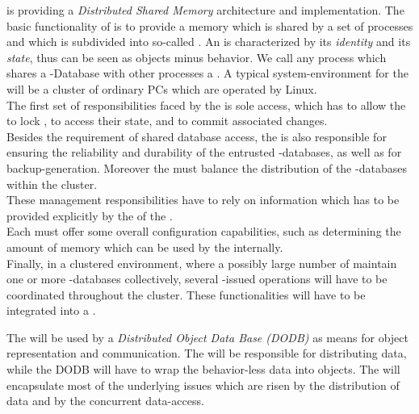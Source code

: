 \documentclass[a4paper, 12pt]{book}
\begin{document}
\SYNEIGHT is providing a \emph{Distributed Shared Memory}
architecture and implementation. The basic functionality of
\SYNEIGHT is to provide a memory which is shared by a set of
processes and which is subdivided into so-called . An
 is characterized by its \emph{identity} and its
\emph{state}, thus  can be seen as objects minus behavior.
We call any process which shares a \SYNEIGHT-Database with other
processes a . A typical system-environment for
the \SYNEIGHT will be a cluster of ordinary PCs which are operated
by Linux.\\

The first set of responsibilities faced by the \SYNEIGHT is sole
access, which has to allow the  to lock , to
access their state, and to commit associated changes.\\

Besides the requirement of shared database access, the \SYNEIGHT
is also responsible for ensuring the reliability and durability of the
entrusted \SYNEIGHT-databases, as well as for backup-generation.
Moreover the \SYNEIGHT must balance the distribution of the
\SYNEIGHT-databases within the cluster.\\

% 
These management responsibilities have to rely on information which has
to be provided explicitly by the  of the \SYNEIGHT.\\

Each  must offer some overall configuration
capabilities, such as determining the amount of memory which can be used
by the \SYNEIGHT internally.\\

Finally, in a clustered environment, where a possibly large number of
 maintain one or more \SYNEIGHT-databases
collectively, several -issued operations will have to be
coordinated throughout the cluster. These functionalities will have to
be integrated into a .

The \SYNEIGHT will be used by a \emph{Distributed Object Data Base
(DODB)} as means for object representation and communication. The
\SYNEIGHT will be responsible for distributing data, while the
DODB will have to wrap the behavior-less data into objects. The
\SYNEIGHT will encapsulate most of the underlying issues which are
risen by the distribution of data and by the concurrent data-access. 
\end{document}
